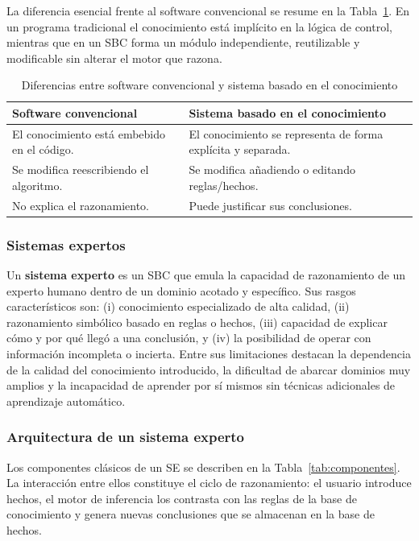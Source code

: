 La diferencia esencial frente al software convencional se resume en la
Tabla~\ref{tab:sbc-vs-conv}. En un programa tradicional el conocimiento
est\'a impl\'icito en la l\'ogica de control, mientras que en un SBC
forma un m\'odulo independiente, reutilizable y modificable sin alterar
el motor que razona.

\begin{table}[htbp]
	\caption{Diferencias entre software convencional y sistema basado en el conocimiento}
	\label{tab:sbc-vs-conv}
	\centering
	\small
	\begin{tabular}{p{2.2cm}p{2.6cm}}
		\toprule
		\textbf{Software convencional} & \textbf{Sistema basado en el conocimiento} \\
		\midrule
		El conocimiento est\'a embebido en el c\'odigo. & El conocimiento se representa de forma expl\'icita y separada. \\
		Se modifica reescribiendo el algoritmo. & Se modifica a\~nadiendo o editando reglas/hechos. \\
		No explica el razonamiento. & Puede justificar sus conclusiones. \\
		\bottomrule
	\end{tabular}
\end{table}

\subsubsection{Sistemas expertos}

Un \textbf{sistema experto} es un SBC que emula la capacidad de
razonamiento de un experto humano dentro de un dominio acotado y
espec\'ifico. Sus rasgos caracter\'isticos son: (i) conocimiento
especializado de alta calidad, (ii) razonamiento simb\'olico basado en
reglas o hechos, (iii) capacidad de explicar c\'omo y por qu\'e lleg\'o
a una conclusi\'on, y (iv) la posibilidad de operar con informaci\'on
incompleta o incierta. Entre sus limitaciones destacan la dependencia
de la calidad del conocimiento introducido, la dificultad de abarcar
dominios muy amplios y la incapacidad de aprender por s\'i mismos sin
t\'ecnicas adicionales de aprendizaje autom\'atico.

\subsubsection{Arquitectura de un sistema experto}

Los componentes cl\'asicos de un SE se describen en la
Tabla~\ref{tab:componentes}. La interacci\'on entre ellos constituye el
ciclo de razonamiento: el usuario introduce hechos, el motor de
inferencia los contrasta con las reglas de la base de conocimiento y
genera nuevas conclusiones que se almacenan en la base de hechos.

